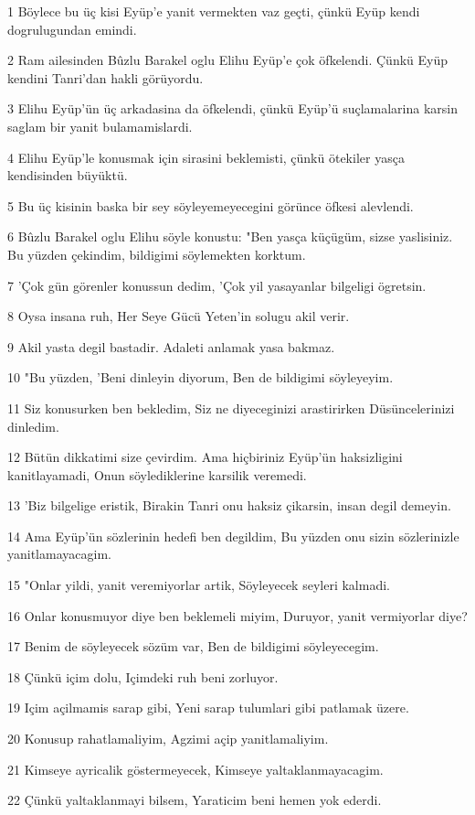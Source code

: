 \par 1 Böylece bu üç kisi Eyüp'e yanit vermekten vaz geçti, çünkü Eyüp kendi dogrulugundan emindi.
\par 2 Ram ailesinden Bûzlu Barakel oglu Elihu Eyüp'e çok öfkelendi. Çünkü Eyüp kendini Tanri'dan hakli görüyordu.
\par 3 Elihu Eyüp'ün üç arkadasina da öfkelendi, çünkü Eyüp'ü suçlamalarina karsin saglam bir yanit bulamamislardi.
\par 4 Elihu Eyüp'le konusmak için sirasini beklemisti, çünkü ötekiler yasça kendisinden büyüktü.
\par 5 Bu üç kisinin baska bir sey söyleyemeyecegini görünce öfkesi alevlendi.
\par 6 Bûzlu Barakel oglu Elihu söyle konustu: "Ben yasça küçügüm, sizse yaslisiniz. Bu yüzden çekindim, bildigimi söylemekten korktum.
\par 7 'Çok gün görenler konussun dedim, 'Çok yil yasayanlar bilgeligi ögretsin.
\par 8 Oysa insana ruh, Her Seye Gücü Yeten'in solugu akil verir.
\par 9 Akil yasta degil bastadir. Adaleti anlamak yasa bakmaz.
\par 10 "Bu yüzden, 'Beni dinleyin diyorum, Ben de bildigimi söyleyeyim.
\par 11 Siz konusurken ben bekledim, Siz ne diyeceginizi arastirirken Düsüncelerinizi dinledim.
\par 12 Bütün dikkatimi size çevirdim. Ama hiçbiriniz Eyüp'ün haksizligini kanitlayamadi, Onun söylediklerine karsilik veremedi.
\par 13 'Biz bilgelige eristik, Birakin Tanri onu haksiz çikarsin, insan degil demeyin.
\par 14 Ama Eyüp'ün sözlerinin hedefi ben degildim, Bu yüzden onu sizin sözlerinizle yanitlamayacagim.
\par 15 "Onlar yildi, yanit veremiyorlar artik, Söyleyecek seyleri kalmadi.
\par 16 Onlar konusmuyor diye ben beklemeli miyim, Duruyor, yanit vermiyorlar diye?
\par 17 Benim de söyleyecek sözüm var, Ben de bildigimi söyleyecegim.
\par 18 Çünkü içim dolu, Içimdeki ruh beni zorluyor.
\par 19 Içim açilmamis sarap gibi, Yeni sarap tulumlari gibi patlamak üzere.
\par 20 Konusup rahatlamaliyim, Agzimi açip yanitlamaliyim.
\par 21 Kimseye ayricalik göstermeyecek, Kimseye yaltaklanmayacagim.
\par 22 Çünkü yaltaklanmayi bilsem, Yaraticim beni hemen yok ederdi.

